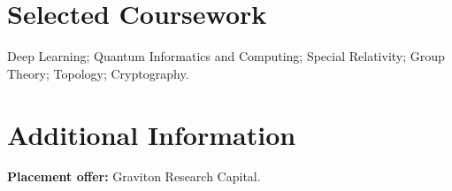 \documentclass[a4paper, 11pt]{article}
\begin{document}
\section{Selected Coursework}
\resumeSubHeadingListStart
\item Deep Learning; Quantum Informatics and Computing; Special Relativity; Group Theory; Topology; Cryptography.
\resumeSubHeadingListEnd

\section{Additional Information}
\resumeSubHeadingListStart
\item \textbf{Placement offer:} Graviton Research Capital.
\resumeSubHeadingListEnd
\end{document}
